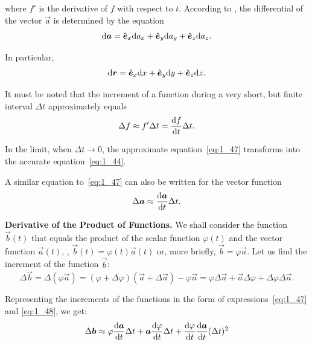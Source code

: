 \noindent
where $f'$ is the derivative of $f$ with respect to $t$.  According to , the differential of the vector $\vec{a}$ is determined by the equation
\begin{equation}\label{eq:1_45}
\mathrm{d}\boldsymbol{a} = \hat{\boldsymbol{e}}_{x}\mathrm{d}a_x + \hat{\boldsymbol{e}}_{y}\mathrm{d}a_y + \hat{\boldsymbol{e}}_{z}\mathrm{d}a_z.
\end{equation}

In particular,
\begin{equation}\label{eq:1_46}
\mathrm{d}\boldsymbol{r} = \hat{\boldsymbol{e}}_{x}\mathrm{d}x + \hat{\boldsymbol{e}}_{y}\mathrm{d}y + \hat{\boldsymbol{e}}_{z}\mathrm{d}z.
\end{equation}

It must be noted that the increment of a function during a very short, but finite interval $\Delta t$ approximately equals
\begin{equation}\label{eq:1_47}
\Delta f \approx f'\Delta t = \frac{\mathrm{d} f}{\mathrm{d} t}\Delta t.
\end{equation}

\noindent
In the limit, when $\Delta t\to 0$, the approximate equation~\eqref{eq:1_47} transforms into the accurate equation~\eqref{eq:1_44}.

A similar equation to~\eqref{eq:1_47} can also be written for the vector function
\begin{equation}\label{eq:1_48}
\Delta\boldsymbol{a} \approx \frac{\mathrm{d}\boldsymbol{a}}{\mathrm{d} t}\Delta t.
\end{equation}

\textbf{Derivative of the Product of Functions.} We shall consider the function $\vec{b}(t)$ that equals the product of the scalar function $\varphi(t)$ and the vector function $\vec{a}(t)$, \ie, $\vec{b}(t)=\varphi(t)\vec{a}(t)$ or, more briefly, $\vec{b}=\varphi\vec{a}$. Let us find the increment of the function $\vec{b}$:
\begin{equation*}
\Delta\vec{b} = \Delta(\varphi\vec{a}) = (\varphi + \Delta\varphi)(\vec{a} + \Delta\vec{a}) - \varphi\vec{a} = \varphi\Delta\vec{a} + \vec{a}\Delta\varphi + \Delta\varphi\Delta\vec{a}.
\end{equation*}

\noindent
Representing the increments of the functions in the form of expressions~\eqref{eq:1_47} and \eqref{eq:1_48}, we get:
\begin{equation*}
\Delta\boldsymbol{b} \approx \varphi\frac{\mathrm{d}\boldsymbol{a}}{\mathrm{d} t}\Delta t + \boldsymbol{a}\frac{\mathrm{d}\varphi}{\mathrm{d} t}\Delta t + \frac{\mathrm{d}\varphi}{\mathrm{d} t}\frac{\mathrm{d}\boldsymbol{a}}{\mathrm{d} t}(\Delta t)^2
\end{equation*}


